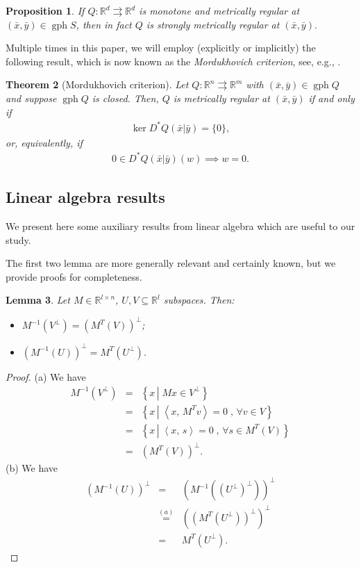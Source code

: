 \documentclass[reqno]{amsart}
\newtheorem{proposition}{Proposition}[section]
\newtheorem{theorem}[proposition]{Theorem}
\newtheorem{lemma}[proposition]{Lemma}
\numberwithin{equation}{section}
\newcommand{\R}{\mathbb{R}}
\newcommand{\x}{\bar{x}}
\newcommand{\gph}{\operatorname{gph}}
\newcommand{\set}[2]{\left\{#1\,\left\vert\; #2\right.\right\}}
\newcommand{\ip}[2]{\left\langle #1,\, #2\right\rangle}
\begin{document}
\begin{proposition}\label{thm:monotonicityAndMetricRegularity}
    If $Q : \R^d \rightrightarrows \R^d$ is monotone and metrically regular at $(\x, \bar y) \in \gph S$, then in fact $Q$ is strongly metrically regular at $(\x, \bar y).$
\end{proposition}

Multiple times in this paper, we will employ (explicitly or implicitly) the following result, which is now known as the {\em Mordukhovich criterion}, see, e.g.,  \cite[Theorem 9.40]{RoW 98}.
\begin{theorem}[Mordukhovich criterion]\label{thm:coderivativeCriterion}
    Let $Q : \R^n \rightrightarrows \R^m$ with $(\x, \bar y) \in \gph Q$ and suppose $\gph Q$ is  closed. Then, $Q$ is metrically regular at $(\x, \bar y)$ if and only if \begin{align*}
        \ker D^*Q(\bar{x} | \bar{y}) = \{0\},
    \end{align*} or, equivalently, if \begin{align*}
        0 \in D^*Q(\x | \bar y)(w) \implies w = 0.
    \end{align*}
\end{theorem}

\subsection{Linear algebra results}

We present here some auxiliary results from linear algebra which are useful to our study. 

The first two  lemma are  more generally relevant and certainly known, but we provide  proofs for completeness.
\begin{lemma}\label{lem:Sub} Let $M\in \R^{l\times n}$, $U,V\subseteq\R^l$ subspaces. Then:
\begin{itemize}
    \item[(a)] $M^{-1}(V^\perp)=(M^T(V))^\perp$;
    \item[(b)] $\left(M^{-1}(U)\right)^\perp=M^T(U^\perp)$.
\end{itemize}
\end{lemma}
\begin{proof}(a) We have 
\begin{eqnarray*}
   M^{-1}(V^\perp) & =& \set{x}{Mx\in V^\perp}\\
   & = & \set{x}{\ip{x}{M^Tv}=0\; , \, \forall v\in V}\\
   & = & \set{x}{\ip{x}{s}=0\;, \, \forall s\in M^T(V)}\\
   & = & (M^T(V))^\perp.
\end{eqnarray*}
(b)    We have 
\begin{eqnarray*}
   (M^{-1}(U))^\perp & = & (M^{-1}\left((U^\perp)^\perp\right))^\perp\\
   &\overset{(a)}{=} & \left(\left(M^T(U^\perp)\right)^\perp\right)^\perp\\
   & = & M^T(U^\perp).
\end{eqnarray*}
\end{proof}
\end{document}
